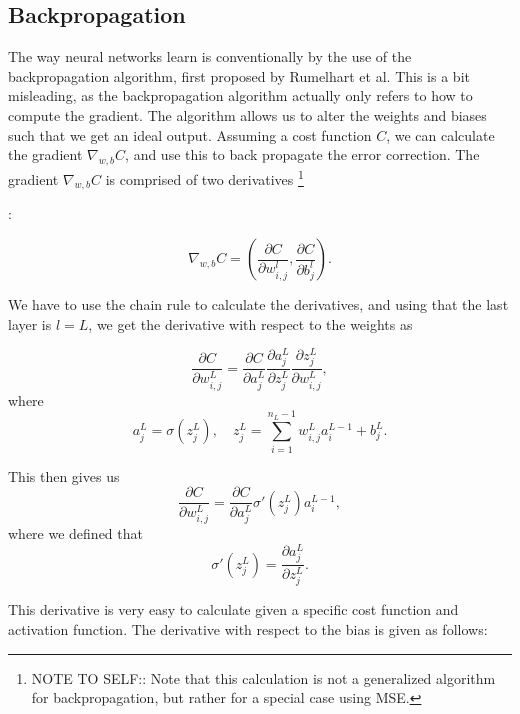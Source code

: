 \subsection*{Backpropagation}
The way neural networks learn is conventionally by the use of the backpropagation algorithm, first proposed by Rumelhart et al\cite{backprop}. This is a bit misleading, 
as the backpropagation algorithm actually only refers to how to compute the gradient\cite{Goodfellow-et-al-2016}. The algorithm allows us to alter the weights and biases such that
we get an ideal output. Assuming a cost function $C$, we can calculate the gradient $\nabla_{w, b}C$, and use this to back propagate the error correction. The gradient $\nabla_{w, b}C$ is comprised of 
two derivatives
\footnote{NOTE TO SELF:: Note that this calculation is not a generalized algorithm for backpropagation, but rather for a special case using MSE.}\par
:\par 

\begin{equation*}
    \nabla_{w, b}C = \left(\frac{\partial C}{\partial w_{i,j}^l}, \frac{\partial C}{\partial b_j^l}\right).
\end{equation*}

We have to use the chain rule to calculate the derivatives, and using that the last layer is $l=L$, we get the derivative with respect to the weights as 

\begin{equation*}
    \frac{\partial C}{\partial w_{i,j}^L} = \frac{\partial C}{\partial a_j^L}\frac{\partial a_j^L}{\partial z_j^L}\frac{\partial z_j^L}{\partial w_{i,j}^L},
\end{equation*}
where 
\begin{equation*}
    a_j^L = \sigma(z_j^L), \quad z_j^L = \sum_{i=1}^{n_L-1} w_{i,j}^La_i^{L-1} + b_j^L.
\end{equation*}

This then gives us 
\begin{equation*}
    \frac{\partial C}{\partial w_{i,j}^L} = \frac{\partial C}{\partial a_j^L}\sigma'(z_j^L)a_i^{L-1},
\end{equation*}
where we defined that 
\begin{equation}\label{eq:sigma_der}
    \sigma'(z_j^L) = \frac{\partial a_j^L}{\partial z_j^L}.
\end{equation}

This derivative is very easy to calculate given a specific cost function and activation function. The derivative with respect to the bias is given as follows:


